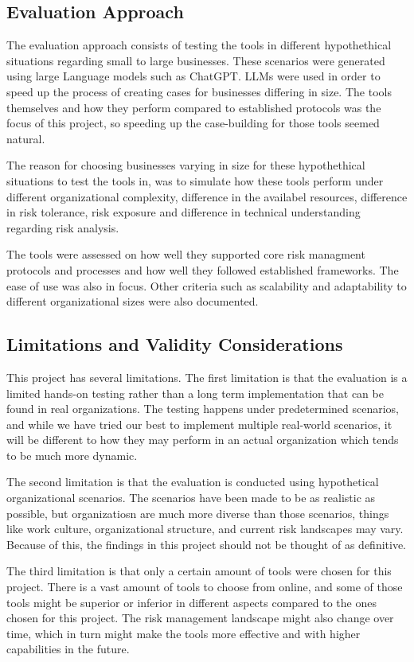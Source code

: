 \subsection{Evaluation Approach}
The evaluation approach consists of testing the tools in different hypothethical situations regarding small to large businesses. These scenarios were generated using large Language models such as ChatGPT. LLMs were used in order to speed up the process of creating cases for businesses differing in size. The tools themselves and how they perform compared to established protocols was the focus of this project, so speeding up the case-building for those tools seemed natural.

The reason for choosing businesses varying in size for these hypothethical situations to test the tools in, was to simulate how these tools perform under different organizational complexity, difference in the availabel resources, difference in risk tolerance, risk exposure and difference in technical understanding regarding risk analysis.

The tools were assessed on how well they supported core risk managment protocols and processes and how well they followed established frameworks. The ease of use was also in focus. Other criteria such as scalability and adaptability to different organizational sizes were also documented.

\subsection{Limitations and Validity Considerations}
This project has several limitations. The first limitation is that the evaluation is a limited hands-on testing rather than a long term implementation that can be found in real organizations. The testing happens under predetermined scenarios, and while we have tried our best to implement multiple real-world scenarios, it will be different to how they may perform in an actual organization which tends to be much more dynamic.

The second limitation is that the evaluation is conducted using hypothetical organizational scenarios. The scenarios have been made to be as realistic as possible, but organizatiosn are much more diverse than those scenarios, things like work culture, organizational structure, and current risk landscapes may vary. Because of this, the findings in this project should not be thought of as definitive. 

The third limitation is that only a certain amount of tools were chosen for this project. There is a vast amount of tools to choose from online, and some of those tools might be superior or inferior in different aspects compared to the ones chosen for this project. The risk management landscape might also change over time, which in turn might make the tools more effective and with higher capabilities in the future.

